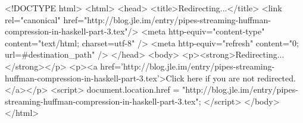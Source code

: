 <!DOCTYPE html>
<html>
<head>
<title>Redirecting...</title>
<link rel="canonical" href="http://blog.jle.im/entry/pipes-streaming-huffman-compression-in-haskell-part-3.tex"/>
<meta http-equiv="content-type" content="text/html; charset=utf-8" />
<meta http-equiv="refresh" content="0; url=#{destination_path}" />
</head>
<body>
  <p><strong>Redirecting...</strong></p>
  <p><a href='http://blog.jle.im/entry/pipes-streaming-huffman-compression-in-haskell-part-3.tex'>Click here if you are not redirected.</a></p>
  <script>
    document.location.href = "http://blog.jle.im/entry/pipes-streaming-huffman-compression-in-haskell-part-3.tex";
  </script>
</body>
</html>
